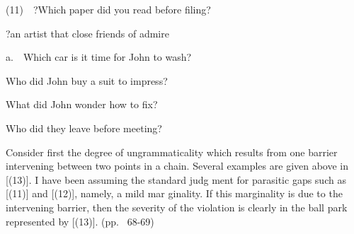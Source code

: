 \begin{multicols}{2}
\begin{styleTextbody}
(11)\ \ ?Which paper did you read before filing?
\end{styleTextbody}


\setcounter{listWWNumlviileveli}{11}
\begin{listWWNumlviileveli}
\item 
\begin{styleTextbody}
?an artist that close friends of admire
\end{styleTextbody}


\item 
\begin{styleTextbody}
a.\ \ Which car is it time for John to wash?
\end{styleTextbody}


\end{listWWNumlviileveli}
\setcounter{listWWNumlvileveli}{1}
\begin{listWWNumlvileveli}
\item 
\begin{styleTextbody}
Who did John buy a suit to impress?
\end{styleTextbody}


\item 
\begin{styleTextbody}
What did John wonder how to fix?
\end{styleTextbody}


\item 
\begin{styleTextbody}
Who did they leave before meeting?
\end{styleTextbody}


\end{listWWNumlvileveli}
\begin{styleStandard}
[= Browning{\textquotesingle}s (l)]
\end{styleStandard}


\begin{styleStandard}
[= Browning{\textquotesingle}s (2)]
\end{styleStandard}


\begin{styleStandard}
[= Browning{\textquotesingle}s (40)]
\end{styleStandard}


\end{multicols}
\begin{styleTextbody}
Consider first the degree of ungrammaticality which results from one barrier intervening between two points in a chain. Several examples are given above in [(13)]. I have been assuming the standard judg\- ment for parasitic gaps such as [(11)] and [(12)], namely, a mild mar\- ginality. If this marginality is due to the intervening barrier, then the severity of the violation is clearly in the ball park represented by [(13)]. (pp. \ 68-69)
\end{styleTextbody}


